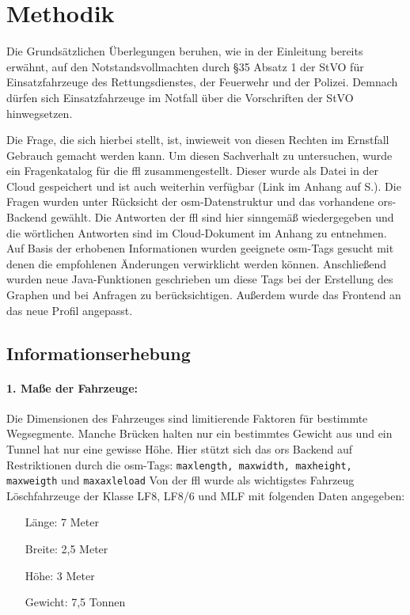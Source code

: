 \section{Methodik}
Die Grundsätzlichen Überlegungen beruhen, wie in der Einleitung bereits erwähnt, auf den Notstandsvollmachten durch §35 Absatz 1 der StVO für Einsatzfahrzeuge des Rettungsdienstes, der Feuerwehr und der Polizei.
Demnach dürfen sich Einsatzfahrzeuge im Notfall über die Vorschriften der StVO hinwegsetzen.

Die Frage, die sich hierbei stellt, ist, inwieweit von diesen Rechten im Ernstfall Gebrauch gemacht werden kann.
Um diesen Sachverhalt zu untersuchen, wurde ein Fragenkatalog für die \gls{ffl} zusammengestellt.
Dieser wurde als Datei in der Cloud gespeichert und ist auch weiterhin verfügbar (Link im Anhang auf S.\pageref{sec:anhang}).
Die Fragen wurden unter Rücksicht der \gls{osm}-Datenstruktur und das vorhandene \gls{ors}-Backend gewählt.
Die Antworten der \gls{ffl} sind hier sinngemäß wiedergegeben und die wörtlichen Antworten sind im Cloud-Dokument im Anhang zu entnehmen.
Auf Basis der erhobenen Informationen wurden geeignete \gls{osm}-Tags gesucht mit denen die empfohlenen Änderungen verwirklicht werden können.
Anschließend wurden neue Java-Funktionen geschrieben um diese Tags bei der Erstellung des Graphen und bei Anfragen zu berücksichtigen.
Außerdem wurde das Frontend an das neue Profil angepasst.

\subsection{Informationserhebung}

\paragraph*{1. Maße der Fahrzeuge:}
\label{frage1}
\par
Die Dimensionen des Fahrzeuges sind limitierende Faktoren für bestimmte Wegsegmente.
Manche Brücken halten nur ein bestimmtes Gewicht aus und ein Tunnel hat nur eine gewisse Höhe.
Hier stützt sich das \gls{ors} Backend auf Restriktionen durch die \gls{osm}-Tags: \texttt{maxlength, maxwidth, maxheight, maxweigth} und \texttt{maxaxleload} Von der \gls{ffl} wurde als wichtigstes Fahrzeug Löschfahrzeuge der Klasse LF8, LF8/6 und MLF mit folgenden Daten angegeben:
\begin{itemize}
\centering
\item[Länge:] 7 Meter
\item[Breite:] 2,5 Meter
\item[Höhe:] 3 Meter
\item[Gewicht:] 7,5 Tonnen
\end{itemize}

